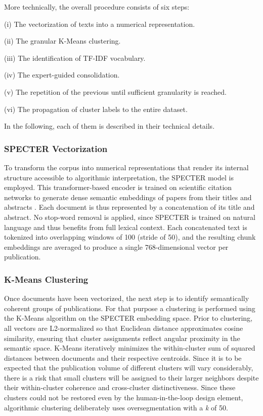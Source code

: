 \documentclass{article}
\begin{document}
	
	More technically, the overall procedure consists of six steps:
	
	(i) The vectorization of texts into a numerical representation.
	
	(ii) The granular K-Means clustering.
	
	(iii) The identification of TF-IDF vocabulary.
	
	(iv) The expert-guided consolidation.
	
	(v) The repetition of the previous until sufficient granularity is reached.
	
	(vi) The propagation of cluster labels to the entire dataset. 
	
	In the following, each of them is described in their technical details.
	
	\subsubsection{SPECTER Vectorization}
	
	To transform the corpus into numerical representations that render its internal structure accessible to algorithmic interpretation, the SPECTER model is employed. This transformer-based encoder is trained on scientific citation networks to generate dense semantic embeddings of papers from their titles and abstracts \cite{cohan2020specter}. Each document is thus represented by a concatenation of its title and abstract. No stop-word removal is applied, since SPECTER is trained on natural language and thus benefits from full lexical context. Each concatenated text is tokenized into overlapping windows of 100 (stride of 50), and the resulting chunk embeddings are averaged to produce a single 768-dimensional vector per publication.
	
	
	\subsubsection{K-Means Clustering}
	
	Once documents have been vectorized, the next step is to identify semantically coherent groups of publications. For that purpose a clustering is performed using the K-Means algorithm on the SPECTER embedding space. Prior to clustering, all vectors are L2-normalized so that Euclidean distance approximates cosine similarity, ensuring that cluster assignments reflect angular proximity in the semantic space. K-Means iteratively minimizes the within-cluster sum of squared distances between documents and their respective centroids. Since it is to be expected that the publication volume of different clusters will vary considerably, there is a risk that small clusters will be assigned to their larger neighbors despite their within-cluster coherence and cross-cluster distinctiveness. Since these clusters could not be restored even by the human-in-the-loop design element, algorithmic clustering deliberately uses oversegmentation with a \textit{k} of 50.
	
\end{document}
